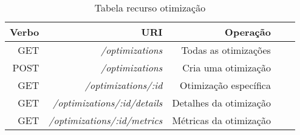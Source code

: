 \begin{table}[!htb]
    \centering
    \caption[resource-optimization]{Tabela recurso otimização
    \label{tab:tabela-optimization}}
    \begin{tabular}{rrrrr}
        \toprule
            Verbo & URI & Operação \\ 
        \midrule
            GET & \textit{/optimizations} & Todas as otimizações \\
            POST & \textit{/optimizations} &  Cria uma otimização \\
            GET & \textit{/optimizations/:id} & Otimização específica \\
            GET & \textit{/optimizations/:id/details} & Detalhes da otimização \\
            GET & \textit{/optimizations/:id/metrics} & Métricas da otimização \\
        \bottomrule
    \end{tabular}
\end{table}
